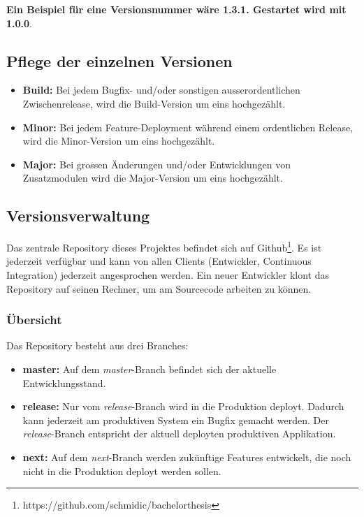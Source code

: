 \textbf{Ein Beispiel für eine Versionsnummer wäre 1.3.1. Gestartet wird mit 1.0.0}. 
\subsection{Pflege der einzelnen Versionen}
\begin{itemize}
\item \textbf{Build:} Bei jedem Bugfix- und/oder sonstigen ausserordentlichen Zwischenrelease, wird die Build-Version um eins hochgezählt.
\item \textbf{Minor:} Bei jedem Feature-Deployment während einem ordentlichen Release, wird die Minor-Version um eins hochgezählt.
\item \textbf{Major:} Bei grossen Änderungen und/oder Entwicklungen von Zusatzmodulen wird die Major-Version um eins hochgezählt.

\end{itemize}


\subsection{Versionsverwaltung}
Das zentrale Repository dieses Projektes befindet sich auf Github\footnote{https://github.com/schmidic/bachelorthesis}. Es ist jederzeit verfügbar und kann von allen Clients (Entwickler, Continuous Integration) jederzeit angesprochen werden. Ein neuer Entwickler klont das Repository auf seinen Rechner, um am Sourcecode arbeiten zu können.
\subsubsection{Übersicht}
Das Repository besteht aus drei Branches:
\begin{itemize}
\item \textbf{master:} Auf dem \textit{master}-Branch befindet sich der aktuelle Entwicklungsstand. 
\item \textbf{release:} Nur vom \textit{release}-Branch wird in die Produktion deployt. Dadurch kann jederzeit am produktiven System ein Bugfix gemacht werden. Der \textit{release}-Branch entspricht der aktuell deployten produktiven Applikation.
\item \textbf{next:} Auf dem \textit{next}-Branch werden zukünftige Features entwickelt, die noch nicht in die Produktion deployt werden sollen.
\end{itemize}

